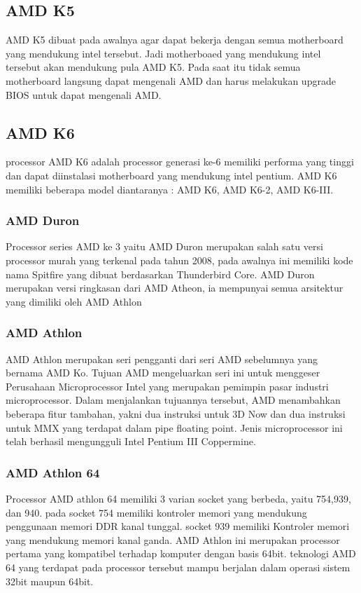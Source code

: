  			\subsection{ AMD K5 }
 	AMD K5 dibuat pada awalnya agar dapat bekerja dengan semua motherboard yang mendukung intel tersebut. Jadi motherboaed yang mendukung intel tersebut akan mendukung pula AMD K5. Pada saat itu tidak semua motherboard langsung dapat mengenali AMD dan harus melakukan upgrade BIOS untuk dapat mengenali AMD.
 			\subsection{ AMD K6 }
 	processor AMD K6 adalah processor generasi ke-6 memiliki performa yang tinggi dan dapat diinstalasi motherboard yang mendukung intel pentium. AMD K6 memiliki beberapa model diantaranya : AMD K6, AMD K6-2, AMD K6-III.


			\subsubsection{AMD Duron}
 	Processor series AMD ke 3 yaitu AMD Duron merupakan salah satu versi processor murah yang terkenal pada tahun 2008, pada awalnya ini memiliki kode nama Spitfire yang dibuat berdasarkan Thunderbird Core. AMD Duron merupakan versi ringkasan dari AMD Atheon, ia mempunyai semua arsitektur yang dimiliki oleh AMD  Athlon
 			\subsubsection{AMD Athlon}
 	AMD Athlon merupakan seri pengganti dari seri AMD sebelumnya yang bernama AMD Ko. Tujuan AMD mengeluarkan seri ini untuk menggeser Perusahaan Microprocessor Intel yang merupakan pemimpin pasar industri microprocessor. Dalam menjalankan tujuannya tersebut, AMD menambahkan beberapa fitur tambahan, yakni dua instruksi untuk 3D Now dan dua instruksi untuk MMX yang terdapat dalam pipe floating point. Jenis microprocessor ini telah berhasil mengungguli Intel Pentium III Coppermine.


 			\subsubsection{AMD Athlon 64}
 	Processor AMD athlon 64 memiliki 3 varian socket yang berbeda, yaitu 754,939, dan 940. pada socket 754 memiliki kontroler memori yang mendukung penggunaan memori DDR kanal tunggal. socket 939 memiliki Kontroler memori yang mendukung memori kanal ganda. AMD Athlon ini merupakan processor pertama yang kompatibel terhadap komputer dengan basis 64bit.  teknologi AMD 64 yang terdapat pada processor tersebut mampu berjalan dalam operasi sistem 32bit maupun 64bit.


